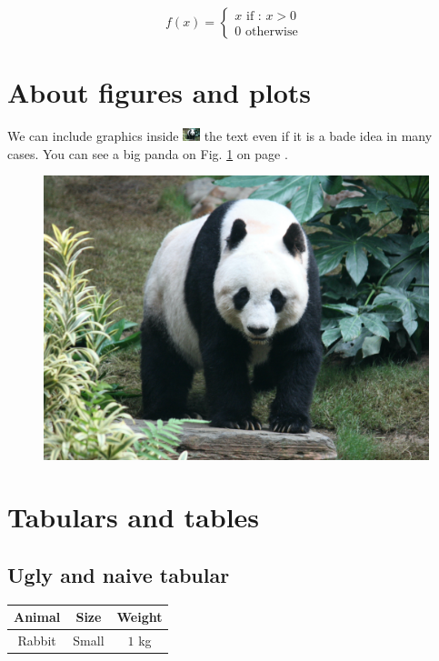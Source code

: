\documentclass[10pt,a4paper]{article}
\begin{document}
\begin{equation}
    f(x) =
    \left\lbrace
    \begin{split}
        x \mbox{ if : } x > 0 \\
        0 \mbox { otherwise }
    \end{split}
    \right.
\end{equation}

\section{About figures and plots}

\blindtext[1]
We can include graphics inside
\includegraphics[width = 5mm]{figures/awesome_panda.jpeg}
the text even if it is a bade idea in many cases.
\blindtext[1]
You can see a big panda on Fig. \ref{fig:panda} on page \pageref{fig:panda}.

\begin{figure}
    \begin{center}
        \includegraphics[width = .5\textwidth]{figures/awesome_panda.jpeg}
    \end{center}
    \caption{\blindtext[1]}
    \label{fig:panda}
\end{figure}

\section{Tabulars and tables}

\subsection{Ugly and naive tabular}

\begin{tabular}{|c|c|c|}
\hline 
\textbf{Animal} & \textbf{Size} & \textbf{Weight} \\ 
\hline 
Rabbit & Small & $1$ kg \\ 
\hline 
\end{tabular} 
\end{document}
